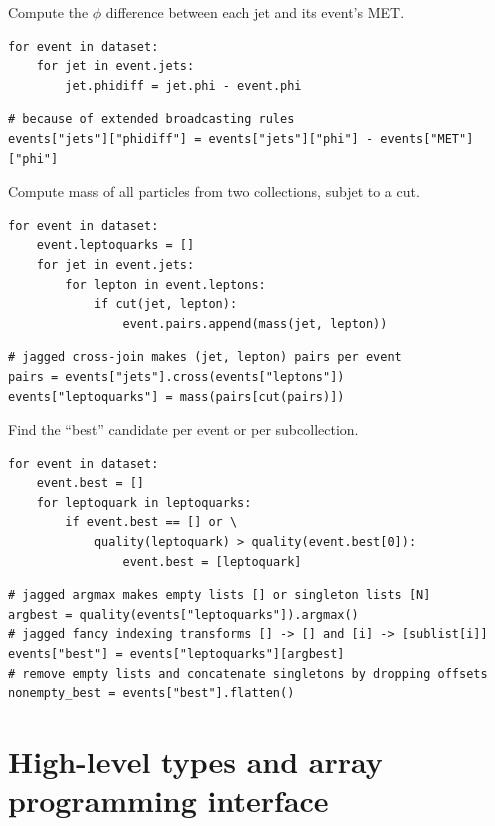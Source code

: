 \documentclass{webofc}
\begin{document}
{\small

 Compute the $\phi$ difference between each jet and its event's MET.
\begin{verbatim}
for event in dataset:
    for jet in event.jets:
        jet.phidiff = jet.phi - event.phi
\end{verbatim}

\begin{verbatim}
# because of extended broadcasting rules
events["jets"]["phidiff"] = events["jets"]["phi"] - events["MET"]["phi"]
\end{verbatim}

 Compute mass of all particles from two collections, subjet to a cut.
\begin{verbatim}
for event in dataset:
    event.leptoquarks = []
    for jet in event.jets:
        for lepton in event.leptons:
            if cut(jet, lepton):
                event.pairs.append(mass(jet, lepton))
\end{verbatim}

\begin{verbatim}
# jagged cross-join makes (jet, lepton) pairs per event
pairs = events["jets"].cross(events["leptons"])
events["leptoquarks"] = mass(pairs[cut(pairs)])
\end{verbatim}

 Find the ``best'' candidate per event or per subcollection.
\begin{verbatim}
for event in dataset:
    event.best = []
    for leptoquark in leptoquarks:
        if event.best == [] or \
            quality(leptoquark) > quality(event.best[0]):
                event.best = [leptoquark]
\end{verbatim}

\begin{verbatim}
# jagged argmax makes empty lists [] or singleton lists [N]
argbest = quality(events["leptoquarks"]).argmax()
# jagged fancy indexing transforms [] -> [] and [i] -> [sublist[i]]
events["best"] = events["leptoquarks"][argbest]
# remove empty lists and concatenate singletons by dropping offsets
nonempty_best = events["best"].flatten()
\end{verbatim}

}

\section{High-level types and array programming interface}
\end{document}
